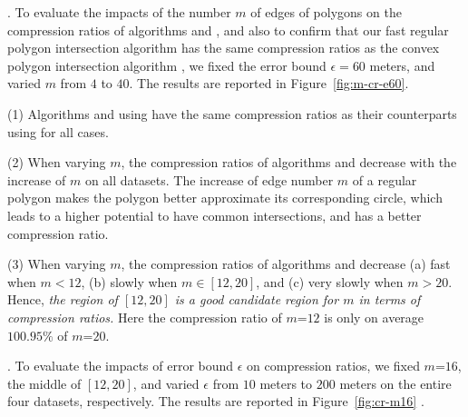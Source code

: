 {%
.
To evaluate the impacts of the number $m$ of edges of polygons on the compression ratios of algorithms \cist and \cista, and also to confirm that our fast regular polygon intersection algorithm \rpia has the same compression ratios as the convex polygon intersection algorithm \cpia,
we fixed the error bound {$\epsilon =60$ meters}, and varied $m$ from $4$ to $40$. The results are reported in Figure~\ref{fig:m-cr-e60}.

\ni(1) Algorithms \cist and \cista using \rpia have the same compression ratios as their counterparts using \cpia for all cases.

\ni(2) When varying $m$, the compression ratios of algorithms
{\cist and \cista} decrease with the increase of $m$ on all datasets.
{The increase of edge number $m$ of a regular polygon makes the  polygon better approximate its corresponding circle, which leads to a higher potential to have common intersections, and has a better compression ratio.}


\ni(3) When varying $m$, the compression ratios of algorithms {\cist and \cista} decrease (a) fast when $m < 12$, (b) slowly when $m \in [12, 20]$, and (c) very slowly when $m > 20$. Hence, \emph{the region of $[12, 20]$ is a good candidate region for $m$ in terms of compression ratios.}
Here the compression ratio of $m$=$12$ is only on average {$100.95\%$} of $m$=$20$.




.
To evaluate the impacts of error bound $\epsilon$ on compression ratios, we fixed {$m$=$16$}, the middle of $[12, 20]$, and varied $\epsilon$ from $10$ meters to $200$ meters on the entire four datasets, respectively.
The results are reported in Figure~\ref{fig:cr-m16} .


}
